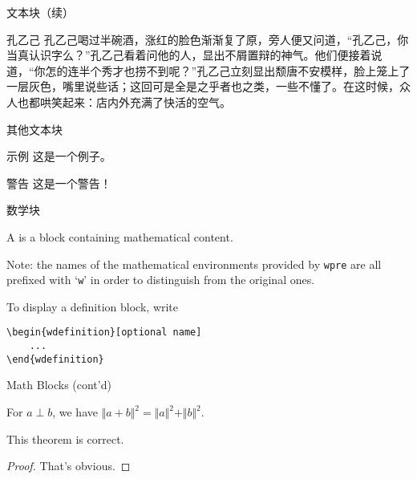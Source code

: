 \documentclass[no-math, aspectratio=1610, 10pt]{beamer}
\begin{document}
    \begin{frame}{文本块（续）}
        \begin{block}{孔乙己}
            \linespread{1.3}
            \setlength{\parindent}{2em}
            孔乙己喝过半碗酒，涨红的脸色渐渐复了原，旁人便又问道，“孔乙己，你当真认识字么？”孔乙己看着问他的人，显出不屑置辩的神气。他们便接着说道，“你怎的连半个秀才也捞不到呢？”孔乙己立刻显出颓唐不安模样，脸上笼上了一层灰色，嘴里说些话；这回可是全是之乎者也之类，一些不懂了。在这时候，众人也都哄笑起来：店内外充满了快活的空气。
        \end{block}
    \end{frame}

    \begin{frame}{其他文本块}
        \begin{exampleblock}{示例}
            这是一个例子。
        \end{exampleblock}

        \begin{alertblock}{警告}
            这是一个警告！
        \end{alertblock}
    \end{frame}

    \begin{frame}[fragile]{数学块}
        \begin{wdefinition}
            A  is a block containing mathematical content.
        \end{wdefinition}

        \alert{Note:} the names of the mathematical environments provided by \texttt{wpre} are all prefixed with `\texttt{w}' in order to distinguish from the original ones.

        \begin{wexample}
            To display a definition block, write
            \begin{verbatim}
\begin{wdefinition}[optional name]
    ...
\end{wdefinition}\end{verbatim}
        \end{wexample}
    \end{frame}

    \begin{frame}{Math Blocks (cont'd)}
        \begin{wlemma}
            For $a\perp b$, we have $\Vert a + b\Vert^2 = \Vert a\Vert^2 + \Vert b\Vert^2$.
        \end{wlemma}

        \begin{wtheorem}
            This theorem is correct.
        \end{wtheorem}

        \begin{proof}
            That's obvious.
        \end{proof}
    \end{frame}
\end{document}
